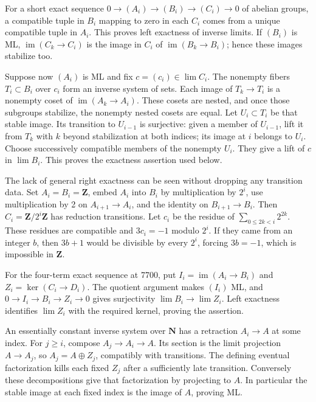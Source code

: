 \documentclass[11pt]{article}
\begin{document}
For a short exact sequence \(0\to(A_i)\to(B_i)\to(C_i)\to0\) of abelian groups, a compatible tuple in \(B_i\) mapping to zero in each \(C_i\) comes from a unique compatible tuple in \(A_i\). This proves left exactness of inverse limits. If \((B_i)\) is ML, \(\operatorname{im}(C_k\to C_i)\) is the image in \(C_i\) of \(\operatorname{im}(B_k\to B_i)\); hence these images stabilize too.

Suppose now \((A_i)\) is ML and fix \(c=(c_i)\in\lim C_i\). The nonempty fibers \(T_i\subset B_i\) over \(c_i\) form an inverse system of sets. Each image of \(T_k\to T_i\) is a nonempty coset of \(\operatorname{im}(A_k\to A_i)\). These cosets are nested, and once those subgroups stabilize, the nonempty nested cosets are equal. Let \(U_i\subset T_i\) be that stable image. Its transition to \(U_{i-1}\) is surjective: given a member of \(U_{i-1}\), lift it from \(T_k\) with \(k\) beyond stabilization at both indices; its image at \(i\) belongs to \(U_i\). Choose successively compatible members of the nonempty \(U_i\). They give a lift of \(c\) in \(\lim B_i\). This proves the exactness assertion used below.

The lack of general right exactness can be seen without dropping any transition data. Set \(A_i=B_i=\mathbf Z\), embed \(A_i\) into \(B_i\) by multiplication by \(2^i\), use multiplication by 2 on \(A_{i+1}\to A_i\), and the identity on \(B_{i+1}\to B_i\). Then \(C_i=\mathbf Z/2^i\mathbf Z\) has reduction transitions. Let \(c_i\) be the residue of \(\sum_{0\leq 2k<i}2^{2k}\). These residues are compatible and \(3c_i=-1\) modulo \(2^i\). If they came from an integer \(b\), then \(3b+1\) would be divisible by every \(2^i\), forcing \(3b=-1\), which is impossible in \(\mathbf Z\).

For the four-term exact sequence at 7700, put \(I_i=\operatorname{im}(A_i\to B_i)\) and \(Z_i=\ker(C_i\to D_i)\). The quotient argument makes \((I_i)\) ML, and \(0\to I_i\to B_i\to Z_i\to0\) gives surjectivity \(\lim B_i\to\lim Z_i\). Left exactness identifies \(\lim Z_i\) with the required kernel, proving the assertion.

An essentially constant inverse system over \(\mathbf N\) has a retraction \(A_i\to A\) at some index. For \(j\geq i\), compose \(A_j\to A_i\to A\). Its section is the limit projection \(A\to A_j\), so \(A_j=A\oplus Z_j\), compatibly with transitions. The defining eventual factorization kills each fixed \(Z_j\) after a sufficiently late transition. Conversely these decompositions give that factorization by projecting to \(A\). In particular the stable image at each fixed index is the image of \(A\), proving ML.
\end{document}
